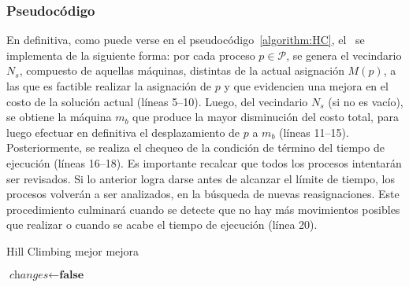 \documentclass[../informe2.tex]{subfiles}
\begin{document}
\subsubsection{Pseudocódigo}
\label{subs:hill-climbing-pseudocodigo}
En definitiva, como puede verse en el pseudocódigo~\ref{algorithm:HC}, el \hillc\ se implementa de la siguiente forma: por cada proceso $p \in \mathcal{P}$, se genera el vecindario $N_s$, compuesto de aquellas máquinas, distintas de la actual asignación $M(p)$, a las que es factible realizar la asignación de $p$ y que evidencien una mejora en el costo de la solución actual (líneas 5--10). Luego, del vecindario $N_s$ (si no es vacío), se obtiene la máquina $m_b$ que produce la mayor disminución del costo total, para luego efectuar en definitiva el desplazamiento de $p$ a $m_b$ (líneas 11--15). Posteriormente, se realiza el chequeo de la condición de término del tiempo de ejecución (líneas 16--18). Es importante recalcar que todos los procesos intentarán ser revisados. Si lo anterior logra darse antes de alcanzar el límite de tiempo, los procesos volverán a ser analizados, en la búsqueda de nuevas reasignaciones. Este procedimiento culminará cuando se detecte que no hay más movimientos posibles que realizar o cuando se acabe el tiempo de ejecución (línea 20).
\begin{algorithm}[ht]
	\caption{Hill Climbing mejor mejora}\label{algorithm:HC}
	\begin{algorithmic}[1]
		\Repeat{}
			\State{} $\textit{changes}\gets \textbf{false}$
					\EndIf{}
				\EndFor{}
				\EndIf{}
				\EndIf{}
			\EndFor{}
		\EndProcedure{}
	\end{algorithmic}
\end{algorithm}
\end{document}
